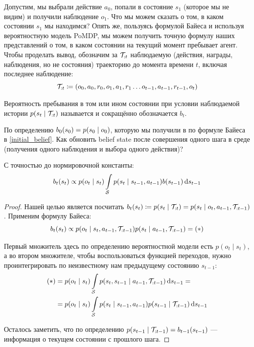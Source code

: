 Допустим, мы выбрали действие $a_0$, попали в состояние $s_1$ (которое мы не видим) и получили наблюдение $o_1$. Что мы можем сказать о том, в каком состоянии $s_1$ мы находимся? Опять же, пользуясь формулой Байеса и используя вероятностную модель PoMDP, мы можем получить точную формулу наших представлений о том, в каком состоянии на текущий момент пребывает агент. Чтобы проделать вывод, обозначим за $\mathcal{T}_{:t}$ наблюдаемую (действия, награды, наблюдения, но не состояния) траекторию до момента времени $t$, включая последнее наблюдение:
$$\mathcal{T}_{:t} \coloneqq (o_0, a_0, r_0, o_1, a_1, r_1 \dots o_{t - 1}, a_{t - 1}, r_{t - 1}, o_t)$$

\begin{definition}
Вероятность пребывания в том или ином состоянии при условии наблюдаемой истории $p(s_t \HM\mid \Traj_{:t})$ называется \emph{} и сокращённо обозначается $b_t$.
\end{definition}

По определению $b_0(s_0) \HM= p(s_0 \HM\mid o_0)$, которую мы получили в по формуле Байеса в \eqref{initial_belief}. Как обновить belief state после совершения одного шага в среде (получения одного наблюдения и выбора одного действия)?

\begin{theorem}
С точностью до нормировочной константы:
\begin{equation}\label{beliefupdate}
b_t(s_t) \propto p(o_{t} \mid s_{t})\int\limits_{\mathcal{S}} p(s_t \mid s_{t - 1}, a_{t - 1})b(s_{t - 1}) \mathop{}\!\mathrm{d} s_{t - 1}
\end{equation}
\begin{proof}
Нашей целью является посчитать $b_t(s_t) \HM\coloneqq p(s_t \HM\mid \Traj_{:t}) \HM= p(s_t \HM\mid o_t, a_{t-1}, \Traj_{:{t-1}})$. Применим формулу Байеса:
$$b_t(s_t) \propto p(o_t \mid s_t, a_{t-1}, \mathcal{T}_{:{t-1}})p(s_t \mid a_{t-1}, \mathcal{T}_{:{t-1}}) = (*)$$

Первый множитель здесь по определению вероятностной модели есть $p(o_t \mid s_t)$, а во втором множителе, чтобы воспользоваться функцией переходов, нужно проинтегрировать по неизвестному нам предыдущему состоянию $s_{t - 1}$:
\begin{align*}
(*) 
&= p(o_t \mid s_t) \int\limits_{\mathcal{S}} p(s_t, s_{t - 1} \mid a_{t - 1}, \mathcal{T}_{:{t-1}}) \mathop{}\!\mathrm{d} s_{t - 1} = \\ 
&= p(o_t \mid s_t) \int\limits_{\mathcal{S}} p(s_t \mid s_{t - 1}, a_{t - 1})p(s_{t - 1} \mid \mathcal{T}_{:{t-1}}) \mathop{}\!\mathrm{d} s_{t - 1}
\end{align*}

Осталось заметить, что по определению $p(s_{t - 1} \mid \mathcal{T}_{:{t-1}}) = b_{t - 1}(s_{t - 1})$ --- информация о текущем состоянии с прошлого шага.
\end{proof}
\end{theorem}

